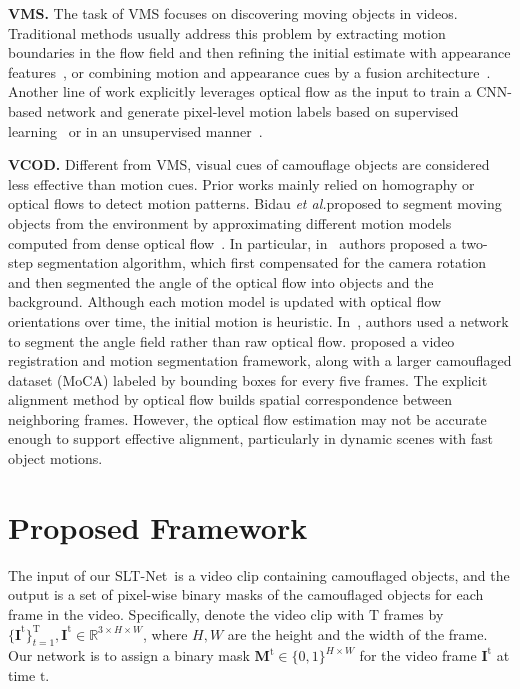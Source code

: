 \documentclass[10pt,twocolumn,letterpaper]{article}
\def\etal{\emph{et al.}}
\def\Ourmodel{SLT-Net}
\begin{document}
\noindent\textbf{VMS.}
The task of VMS focuses on discovering moving objects in videos. Traditional methods usually address this problem by extracting motion boundaries in the flow field and then refining the initial estimate with appearance features~\cite{papazoglou2013fast}, or combining motion and appearance cues by a fusion architecture~\cite{jain2017fusionseg}. Another line of work explicitly leverages optical flow as the input to train a CNN-based network and generate pixel-level motion labels based on supervised learning~\cite{tokmakov2017learning} or in an unsupervised manner~\cite{yang2021selfsupervised}. 

\noindent\textbf{VCOD.}
Different from VMS, visual cues of camouflage objects are considered less effective than motion cues. Prior works mainly relied on homography or optical flows to detect motion patterns. Bidau \etal proposed to segment moving objects from the environment by approximating different motion models computed from dense optical flow~\cite{bideau2016s, bideau2018moa}. In particular, in~\cite{bideau2016s} authors proposed a two-step segmentation algorithm, which first compensated for the camera rotation and then segmented the angle of the optical flow into objects and the background. Although each motion model is updated with optical flow orientations over time, the initial motion is heuristic. In~\cite{bideau2018moa}, authors used a  network to segment the angle field rather than raw optical flow. \cite{lamdouar2020betrayed} proposed a video registration and motion segmentation framework, along with a larger camouflaged dataset (MoCA) labeled by bounding boxes for every five frames. The explicit alignment method by optical flow builds spatial correspondence between neighboring frames. However, the optical flow estimation may not be accurate enough to support effective alignment, particularly in dynamic scenes with fast object motions.

\section{Proposed Framework}\label{sec:method}
The input of our \Ourmodel~is a video clip containing camouflaged objects, and the output is a set of pixel-wise binary masks of the camouflaged objects for each frame in the video. Specifically, denote the video clip with $\mathrm{T}$ frames by $\{\mathbf{I}^\mathrm{t}\}_{t=1}^{\mathrm{T}}, \mathbf{I}^\mathrm{t}\in\mathbb{R}^{3 \times H \times W}$, where $H, W$ are the height and the width of the frame. Our network is to assign a binary mask $\mathbf{M}^\mathrm{t}\in \{0,1\}^{ H \times W}$ for the video frame $\mathbf{I}^\mathrm{t}$ at time $\mathrm{t}$. 
\end{document}
